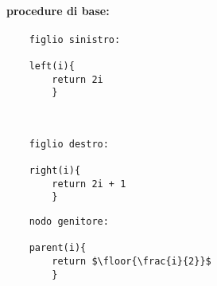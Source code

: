 \documentclass{article}
\DeclarePairedDelimiter\floor{\lfloor}{\rfloor}
\begin{document}
\paragraph{procedure di base:}

\begin{tabbing}
\begin{lstlisting}
    figlio sinistro:

    left(i){
        return 2i
        } 
\end{lstlisting}
\
\begin{lstlisting}
    figlio destro:

    right(i){
        return 2i + 1
        }
\end{lstlisting}
\begin{lstlisting}
    nodo genitore:

    parent(i){
        return $\floor{\frac{i}{2}}$
        }
\end{lstlisting}
    
\end{tabbing}
\end{document}
